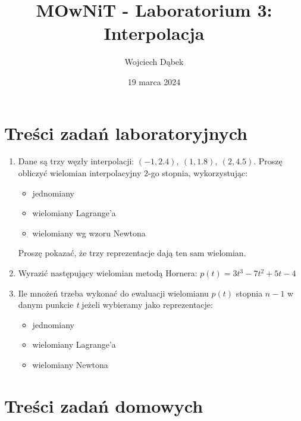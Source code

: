 \documentclass{article}
\title{MOwNiT - Laboratorium 3: \\
Interpolacja}
\author{Wojciech Dąbek}
\date{19 marca 2024}
\begin{document}
\maketitle

\section{Treści zadań laboratoryjnych}

\begin{enumerate}
    \item Dane są trzy węzły interpolacji: \((-1,2.4),\ (1,1.8),\ (2,4.5)\). Proszę obliczyć wielomian interpolacyjny 2-go stopnia, wykorzystując:
    \begin{itemize}
        \item jednomiany
        \item wielomiany Lagrange’a
        \item wielomiany wg wzoru Newtona
    \end{itemize}
    Proszę pokazać, że trzy reprezentacje dają ten sam wielomian.
    \item Wyrazić następujący wielomian metodą Hornera: \(p(t) = 3t^3 - 7t^2 + 5t - 4\)
    \item Ile mnożeń trzeba wykonać do ewaluacji  wielomianu \(p(t)\) stopnia \(n-1\) w danym punkcie \textit{t} jeżeli wybieramy jako reprezentacje:
    \begin{itemize}
        \item jednomiany
        \item wielomiany Lagrange’a
        \item wielomiany Newtona
    \end{itemize}
\end{enumerate}

\section{Treści zadań domowych}
\end{document}

